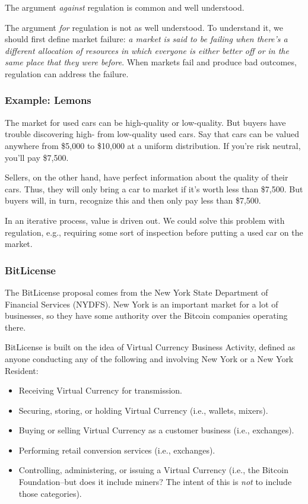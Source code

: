 \documentclass[12pt]{article}
\begin{document}
The argument \textit{against} regulation is common and well understood.

The argument \textit{for} regulation is not as well understood. To understand it, we should first define market failure: \textit{a market is said to be failing when there's a different allocation of resources in which everyone is either better off or in the same place that they were before}. When markets fail and produce bad outcomes, regulation can address the failure.

\subsubsection*{Example: Lemons}

The market for used cars can be high-quality or low-quality. But buyers have trouble discovering high- from low-quality used cars. Say that cars can be valued anywhere from \$5,000 to \$10,000 at a uniform distribution. If you're risk neutral, you'll pay \$7,500. 

Sellers, on the other hand, have perfect information about the quality of their cars. Thus, they will only bring a car to market if it's worth less than \$7,500. But buyers will, in turn, recognize this and then only pay less than \$7,500.

In an iterative process, value is driven out. We could solve this problem with regulation, e.g., requiring some sort of inspection before putting a used car on the market.

\subsubsection*{BitLicense}

The BitLicense proposal comes from the New York State Department of Financial Services (NYDFS). New York is an important market for a lot of businesses, so they have some authority over the Bitcoin companies operating there.

BitLicense is built on the idea of Virtual Currency Business Activity, defined as anyone conducting any of the following and involving New York or a New York Resident:
\begin{itemize}
\item Receiving Virtual Currency for transmission.
\item Securing, storing, or holding Virtual Currency (i.e., wallets, mixers).
\item Buying or selling Virtual Currency as a customer business (i.e., exchanges).
\item Performing retail conversion services (i.e., exchanges).
\item Controlling, administering, or issuing a Virtual Currency (i.e., the Bitcoin Foundation--but does it include miners? The intent of this is \textit{not} to include those categories).
\end{itemize}
\end{document}
